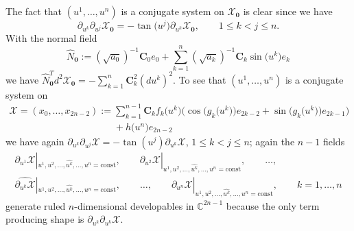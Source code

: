 The fact that $(u^1,\dots ,u^n)$ is a conjugate system on
$\mathcal{X}_{\mathbf{0}}$ is clear since we have
\[
\partial_{u^k}\partial_{u^j}\mathcal{X}_\mathbf{0}=
-\tan\big(u^j\big)\partial_{u^k}\mathcal{X}_\mathbf{0},\qquad 1\le k<j\le n.
\]
With the normal f\/ield
\[
\hat
N_{\mathbf{0}}:=(\sqrt{a_0})^{-1}\mathbf{C}_0e_0+
\sum_{k=1}^n(\sqrt{a_k})^{-1}\mathbf{C}_k\sin\big(u^k\big)e_k
\]
we have $\hat
N_{\mathbf{0}}^Td^2\mathcal{X}_{\mathbf{0}}=-\sum\limits_{k=1}^n\mathbf{C}_k^2(du^k)^2$.
To see that $(u^1,\dots ,u^n)$ is a conjugate system on
\begin{gather*}
\mathcal{X}=(x_0,\dots ,x_{2n-2}):=\sum_{k=1}^{n-1}\mathbf{C}_kf_k\big(u^k\big)\big(\cos\big(g_k\big(u^k\big)\big)e_{2k-2}
+\sin\big(g_k\big(u^k\big)\big)e_{2k-1}\big)\\
\phantom{\mathcal{X}=(x_0,\dots ,x_{2n-2}):=}{} +h\big(u^n\big)e_{2n-2}
\end{gather*}
we have again
$\partial_{u^k}\partial_{u^j}\mathcal{X}=-\tan(u^j)\partial_{u^k}\mathcal{X}$, $1\le k<j\le n$; again the $n-1$ f\/ields
\begin{gather*}
\partial_{u^1}\mathcal{X}|_{u^1,u^2,\dots ,\widehat{u^k},\dots ,u^n=\mathrm{const}},\qquad
\partial_{u^2}\mathcal{X}|_{u^1,u^2,\dots ,\widehat{u^k},\dots ,u^n=\mathrm{const}},\qquad
\dots ,\\
\widehat{\partial_{u^k}\mathcal{X}}|_{u^1,u^2,\dots ,\widehat{u^k},\dots ,u^n=\mathrm{const}},\qquad
\dots ,
\qquad
\partial_{u^n}\mathcal{X}|_{u^1,u^2,\dots ,\widehat{u^k},\dots ,u^n=\mathrm{const}},\qquad
k=1,\dots ,n
\end{gather*}
generate ruled $n$-dimensional developables in $\mathbb{C}^{2n-1}$
because the only term producing shape is
$\partial_{u^k}\partial_{u^k}\mathcal{X}$.

